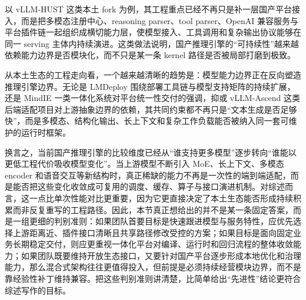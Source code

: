 以 vLLM-HUST 这类本土 fork 为例，其工程重点已经不再只是补一层国产平台接入，而是把多模态注册中心、reasoning parser、tool parser、OpenAI 兼容服务与平台插件链一起组织成横切能力层，使模型接入、工具调用和复杂输出协议能够在同一 serving 主体内持续演进\citep{vllmhust}。这类做法说明，国产推理引擎的“可持续性”越来越依赖能力边界是否模块化，而不只是某一条 kernel 路径是否被局部打磨到极致。

从本土生态的工程走向看，一个越来越清晰的趋势是：模型能力边界正在反向塑造推理引擎边界。无论是 LMDeploy 围绕部署工具链与模型支持矩阵的持续扩展，还是 MindIE 一类一体化系统对平台统一性交付的强调，抑或 vLLM-Ascend 这类后端适配项目对上游抽象边界的依赖，其共同约束都不再只是“文本生成是否足够快”，而是多模态、结构化输出、长上下文和复杂工作负载能否被纳入同一套可维护的运行时框架\citep{lmdeploy,mindie,vllmascend}。

换言之，当前国产推理引擎的比较维度已经从“谁支持更多模型”逐步转向“谁能以更低工程代价吸收模型变化”。当上游模型不断引入 MoE、长上下文、多模态 encoder 和语音交互等新结构时，真正稀缺的能力不再是一次性的端到端适配，而是能否把这些变化收敛成可复用的调度、缓存、算子与接口演进机制。对综述而言，这一点比单次性能对比更重要，因为它更直接决定了本土生态能否形成持续积累而非反复重写的工程路径。因此，本节真正想给出的并不是某一条固定答案，而是一组更细的判别准则：如果团队首要目标是快速跟进模型与服务特性，应优先选择上游距离近、插件接口清晰且共享路径修改受控的方案；如果目标是面向固定业务长期稳定交付，则应更重视一体化平台对编译、运行时和回归流程的整体收敛能力；如果团队既要维持开放生态接口，又要针对国产平台逐步形成本地优化和治理能力，那么混合式架构往往更值得投入，但前提是必须持续经营模块边界，而不是靠经验性补丁维持兼容。把这些判别准则讲清楚，比简单给出“先进性”结论更符合综述写作的目标。
